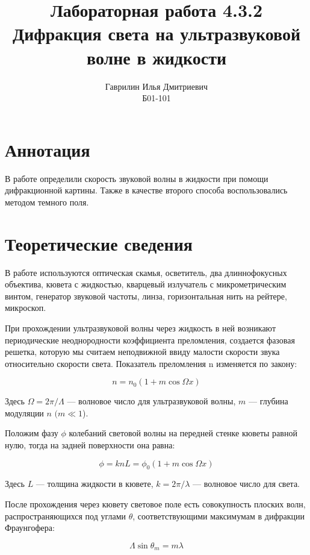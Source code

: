 \documentclass[a4paper, 12pt]{article}%
\author{Гаврилин Илья Дмитриевич \\
	Б01-101}
\title{\textbf{Лабораторная работа 4.3.2\\ 
		Дифракция света на ультразвуковой волне в жидкости}}
\begin{document}
	\maketitle
	\section{Аннотация}
	В работе определили скорость звуковой волны в жидкости при помощи дифракционной картины. Также в качестве второго способа воспользовались методом темного поля.
	\section{Теоретические сведения}
	
	
	В работе используются оптическая скамья, осветитель, два длиннофокусных объектива, кювета с жидкостью, кварцевый излучатель с микрометрическим винтом, генератор звуковой частоты, линза, горизонтальная нить на рейтере, микроскоп. 
	
	При прохождении ультразвуковой волны через жидкость в ней возникают периодические неоднородности коэффициента преломления, создается фазовая решетка, которую мы считаем неподвижной ввиду малости скорости звука относительно скорости света. Показатель
	преломления n изменяется по закону:
	
	\begin{equation}\label{}
	n = n_0 (1 + m \cos \Omega x)
	\end{equation}
	
	Здесь $ \Omega = 2 \pi / \Lambda $ --- волновое число для ультразвуковой волны, $ m $ --- глубина модуляции $ n $ $ (m \ll 1 $).
	
	Положим фазу $ \phi $ колебаний световой волны на передней стенке кюветы равной нулю, тогда на задней поверхности она равна:
	
	\begin{equation}\label{}
	\phi  = k n L = \phi_0 (1 + m \cos \Omega x)
	\end{equation}
	
	Здесь $ L $ --- толщина жидкости в кювете, $ k = 2 \pi / \lambda $ --- волновое число для света.
	
	После прохождения через кювету световое поле есть совокупность плоских волн, распространяющихся под углами $ \theta $, соответствующими максимумам в дифракции Фраунгофера:
	
	\begin{equation}\label{}	
	\Lambda \sin \theta_m = m \lambda
	\end{equation}
	
\end{document}
